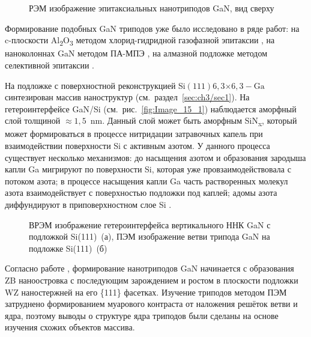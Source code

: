 \begin{figure}[ht]   \caption{РЭМ изображение эпитаксиальных
нанотриподов GaN, вид сверху}\label{fig:Image_14_3} \end{figure}

Формирование подобных GaN триподов уже было исследовано в ряде работ: на
c-плоскости Al\textsubscript{2}O\textsubscript{3} методом хлорид-гидридной
газофазной эпитаксии \cite{Lee2010}, на наноколоннах GaN методом ПА-МПЭ
\cite{Wang2017}, на алмазной подложке методом селективной эпитаксии
\cite{Schuster2015}.

На подложке с поверхностной реконструкцией Si\((111)6,3\)\(\times\)\(6,3 -
\text{Ga}\) синтезирован массив наноструктур (см.~раздел~\cref{sec:ch3/sec1}).
На гетероинтерфейсе GaN/Si (см.~рис.~\cref{fig:Image_15_1}) наблюдается
аморфный слой толщиной \(\approx 1,5\)~\si{\nano\meter}. Данный слой может быть
аморфным SiN\textsubscript{x}, который может формироваться в процессе
нитридации затравочных капель при взаимодействии поверхности Si с активным
азотом. У данного процесса существует несколько механизмов: до насыщения азотом
и образования зародыша капли Ga мигрируют по поверхности Si, которая уже
провзаимодействовала с потоком азота; в процессе насыщения капли Ga часть
растворенных молекул азота взаимодействует с поверхностью подложки под каплей;
адомы азота диффундируют в приповерхностном слое Si \cite{Rawdanowicz2004}.

\begin{figure}[ht]  \caption{ВРЭМ изображение
		гетероинтерфейса вертикального ННК GaN с подложкой Si(111)~(а), ПЭМ
	изображение ветви трипода GaN на подложке Si(111)~(б)}\label{fig:Image_15}
\end{figure}

Согласно работе \cite{Lee2010}, формирование нанотриподов GaN начинается с
образования ZB наноостровка с последующим зарождением и ростом в плоскости
подложки WZ наностержней на его \{111\} фасетках. Изучение триподов методом ПЭМ
затруднено формированием муарового контраста от наложения решёток ветви и ядра,
поэтому выводы о структуре ядра триподов были сделаны на основе изучения схожих
объектов массива.

